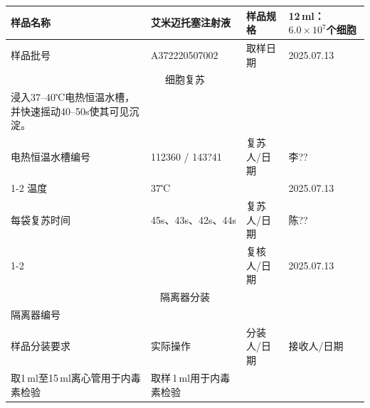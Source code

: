 \documentclass[UTF8,10pt,a4paper,fontset=fandol]{ctexart}
\newcommand{\fieldvalue}[1]{#1}
\newcommand{\handwritten}[1]{#1}
\begin{document}
\begin{tabularx}{\textwidth}{|p{2.5cm}|X|p{2.5cm}|X|}
\hline
样品名称 &
\fieldvalue{艾米迈托塞注射液} &
样品规格 &
\fieldvalue{12\,ml：$6.0\times10^{7}$个细胞}
\\ \hline
样品批号 &
\fieldvalue{\handwritten{A372220507002}} &
取样日期 &
\fieldvalue{\handwritten{2025.07.13}}
\\ \hline
\multicolumn{4}{|c|}{细胞复苏}\\ \hline
浸入37--40℃电热恒温水槽，并快速摇动40--50s使其可见沉淀。 &
\multicolumn{3}{l|}{}\\ \hline
电热恒温水槽编号 &
\fieldvalue{\handwritten{112360 / 143?41}} &
复苏人/日期 &
\fieldvalue{\handwritten{李??}}
\\ \cline{1-2}\cline{4-4}
温度 &
\fieldvalue{\handwritten{37℃}} &
&
\fieldvalue{\handwritten{2025.07.13}}
\\ \hline
每袋复苏时间 &
\fieldvalue{\handwritten{45s、43s、42s、44s}} &
复苏人/日期 &
\fieldvalue{\handwritten{陈??}}
\\ \cline{1-2}\cline{4-4}
&
&
复核人/日期 &
\fieldvalue{\handwritten{2025.07.13}}
\\ \hline
\multicolumn{4}{|c|}{隔离器分装}\\ \hline
隔离器编号 & & \multicolumn{2}{l|}{}\\ \hline
样品分装要求 & 实际操作 & 分装人/日期 & 接收人/日期\\ \hline
取1\,ml至15\,ml离心管用于内毒素检验 &
取样\underline{\hspace{0.5cm}}\,1\,ml用于内毒素检验 &

\end{tabularx}
\end{document}
